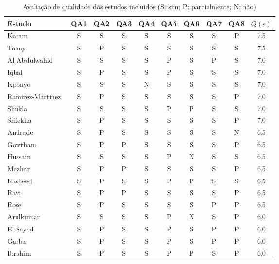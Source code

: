 \documentclass[conference,a4paper]{IEEEtran}
\begin{document}
\begin{table}[H]
\caption{Avaliação de qualidade dos estudos incluídos (S: sim; P: parcialmente; N: não)}\label{tab:qa_resultados}
\centering\scriptsize
\setlength{\tabcolsep}{3.2pt}
\begin{tabular}{@{}lcccccccc c@{}}
\toprule
Estudo & QA1 & QA2 & QA3 & QA4 & QA5 & QA6 & QA7 & QA8 & $Q(e)$ \\
\midrule
Karam~\cite{karam2025isaaf} & S & S & S & S & S & S & S & P & 7,5 \\
Toony~\cite{toony2024multiblock} & S & P & S & S & S & S & S & S & 7,5 \\
Al Abdulwahid~\cite{Abdulwahid2025} & S & S & S & S & P & S & P & S & 7,0 \\
Iqbal~\cite{Iqbal2026}              & S & P & S & S & P & S & S & S & 7,0 \\
Kponyo~\cite{kponyo2020lightweight}   & S & S & S & N & S & S & S & S & 7,0 \\
Ramirez-Martinez~\cite{ramirezmartinez2025p4} & S & P & S & S & S & S & S & P & 7,0 \\
Shukla~\cite{shukla2026cyber} & S & S & S & S & P & P & S & S & 7,0 \\
Srilekha~\cite{srilekha2025hybrid} & S & P & S & S & S & S & S & P & 7,0 \\
Andrade~\cite{andrade2024ddos}        & S & P & S & S & S & S & S & N & 6,5 \\
Gowtham~\cite{gowtham2026fedmp} & S & P & P & S & S & S & S & P & 6,5 \\
Hussain~\cite{hussain2026postquantum} & S & S & S & S & P & N & S & S & 6,5 \\
Mazhar~\cite{mazhar2022ridps} & S & P & P & S & S & S & S & P & 6,5 \\
Rasheed~\cite{Rasheed2026}          & S & P & S & S & P & P & S & S & 6,5 \\
Ravi~\cite{ravi2020semisupervised}    & S & P & P & S & S & S & S & P & 6,5 \\
Rose~\cite{rose2022ideres}            & S & P & S & S & S & S & P & P & 6,5 \\
Arulkumar~\cite{Arulkumar2026}      & S & S & S & S & P & N & S & P & 6,0 \\
El-Sayed~\cite{elsayed2024mpguard}    & S & P & S & S & P & S & P & P & 6,0 \\
Garba~\cite{garba2024sdn} & S & P & S & S & P & S & P & P & 6,0 \\
Ibrahim~\cite{ibrahim2026purechain}   & S & P & S & S & P & P & S & P & 6,0 \\

\end{tabular}
\end{table}
\end{document}
